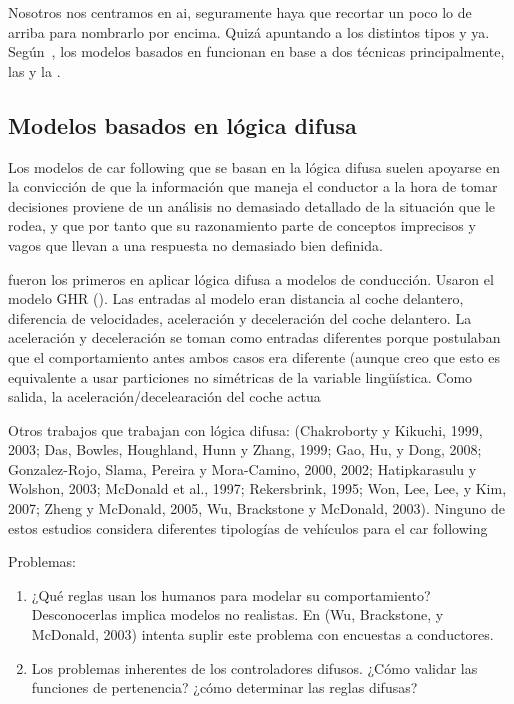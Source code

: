 Nosotros nos centramos en \acrshort{ai}, seguramente haya que recortar un poco lo de arriba para nombrarlo por encima. Quizá apuntando a los distintos tipos y ya. Según~\cite{Aghabayk2015}, los modelos basados en  funcionan en base a dos técnicas principalmente, las  y la .

\subsection{Modelos basados en lógica difusa}

Los modelos de car following que se basan en la lógica difusa suelen apoyarse en la convicción de que la información que maneja el conductor a la hora de tomar decisiones proviene de un análisis no demasiado detallado de la situación que le rodea, y que por tanto que su razonamiento parte de conceptos imprecisos y vagos que llevan a una respuesta no demasiado bien definida.

\cite{Kikuchi1992} fueron los primeros en aplicar lógica difusa a modelos de conducción. Usaron el modelo GHR (\cite{Chandler1958}). Las entradas al modelo eran distancia al coche delantero, diferencia de velocidades, aceleración y deceleración del coche delantero. La aceleración y deceleración se toman como entradas diferentes porque postulaban que el comportamiento antes ambos casos era diferente (aunque creo que esto es equivalente a usar particiones no simétricas de la variable lingüística. Como salida, la aceleración/decelearación del coche actua

Otros trabajos que trabajan con lógica difusa: (Chakroborty y Kikuchi, 1999, 2003; Das, Bowles, Houghland, Hunn y Zhang, 1999; Gao, Hu, y Dong, 2008; Gonzalez-Rojo, Slama, Pereira y Mora-Camino, 2000, 2002; Hatipkarasulu y Wolshon, 2003; McDonald et al., 1997; Rekersbrink, 1995; Won, Lee, Lee, y Kim, 2007; Zheng y McDonald, 2005, Wu, Brackstone y McDonald, 2003). Ninguno de estos estudios considera diferentes tipologías de vehículos para el car following

Problemas:

\begin{enumerate}
	\item ¿Qué reglas usan los humanos para modelar su comportamiento? Desconocerlas implica modelos no realistas. En (Wu, Brackstone, y McDonald, 2003) intenta suplir este problema con encuestas a conductores.
	\item Los problemas inherentes de los controladores difusos. ¿Cómo validar las funciones de pertenencia? ¿cómo determinar las reglas difusas?
\end{enumerate}

